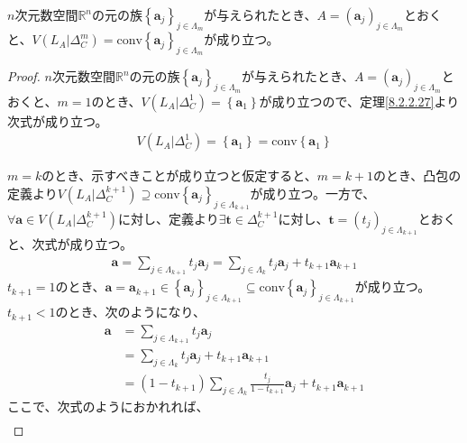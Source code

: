 \documentclass[dvipdfmx]{jsarticle}
\begin{document}
\begin{thm}\label{8.2.2.28}
$n$次元数空間$\mathbb{R}^{n}$の元の族$\left\{ \mathbf{a}_{j} \right\}_{j \in \varLambda_{m}}$が与えられたとき、$A = \left( \mathbf{a}_{j} \right)_{j \in \varLambda_{m}}$とおくと、$V\left( L_{A}|\varDelta_{C}^{m} \right) = \mathrm{conv}\left\{ \mathbf{a}_{j} \right\}_{j \in \varLambda_{m}}$が成り立つ。
\end{thm}
\begin{proof}
$n$次元数空間$\mathbb{R}^{n}$の元の族$\left\{ \mathbf{a}_{j} \right\}_{j \in \varLambda_{m}}$が与えられたとき、$A = \left( \mathbf{a}_{j} \right)_{j \in \varLambda_{m}}$とおくと、$m = 1$のとき、$V\left( L_{A}|\varDelta_{C}^{1} \right) = \left\{ \mathbf{a}_{1} \right\}$が成り立つので、定理\ref{8.2.2.27}より次式が成り立つ。
\begin{align*}
V\left( L_{A}|\varDelta_{C}^{1} \right) = \left\{ \mathbf{a}_{1} \right\} = \mathrm{conv}\left\{ \mathbf{a}_{1} \right\}
\end{align*}\par
$m = k$のとき、示すべきことが成り立つと仮定すると、$m = k + 1$のとき、凸包の定義より$V\left( L_{A}|\varDelta_{C}^{k + 1} \right) \supseteq \mathrm{conv}\left\{ \mathbf{a}_{j} \right\}_{j \in \varLambda_{k + 1}}$が成り立つ。一方で、$\forall\mathbf{a} \in V\left( L_{A}|\varDelta_{C}^{k + 1} \right)$に対し、定義より$\exists\mathbf{t} \in \varDelta_{C}^{k + 1}$に対し、$\mathbf{t} = \left( t_{j} \right)_{j \in \varLambda_{k + 1}}$とおくと、次式が成り立つ。
\begin{align*}
\mathbf{a} = \sum_{j \in \varLambda_{k + 1}} {t_{j}\mathbf{a}_{j}} = \sum_{j \in \varLambda_{k}} {t_{j}\mathbf{a}_{j}} + t_{k + 1}\mathbf{a}_{k + 1}
\end{align*}
$t_{k + 1} = 1$のとき、$\mathbf{a} = \mathbf{a}_{k + 1} \in \left\{ \mathbf{a}_{j} \right\}_{j \in \varLambda_{k + 1}} \subseteq \mathrm{conv}\left\{ \mathbf{a}_{j} \right\}_{j \in \varLambda_{k + 1}}$が成り立つ。$t_{k + 1} < 1$のとき、次のようになり、
\begin{align*}
\mathbf{a} &= \sum_{j \in \varLambda_{k + 1}} {t_{j}\mathbf{a}_{j}}\\
&= \sum_{j \in \varLambda_{k}} {t_{j}\mathbf{a}_{j}} + t_{k + 1}\mathbf{a}_{k + 1}\\
&= \left( 1 - t_{k + 1} \right)\sum_{j \in \varLambda_{k}} {\frac{t_{j}}{1 - t_{k + 1}}\mathbf{a}_{j}} + t_{k + 1}\mathbf{a}_{k + 1}
\end{align*}
ここで、次式のようにおかれれば、
\begin{align*}

\end{align*}
\end{proof}
\end{document}
